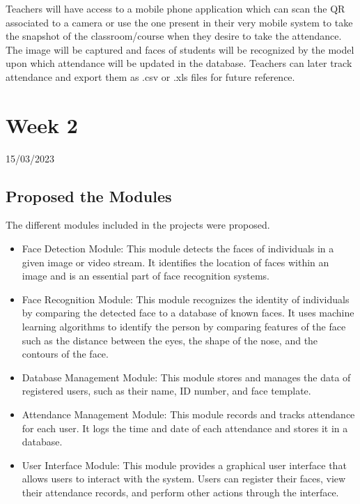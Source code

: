 \documentclass[12pt]{book}
\begin{document}
    Teachers will have access to a mobile phone application
    which can scan the QR associated to a camera or use the one
    present in their very mobile system to take the snapshot of
    the classroom/course when they desire to take the
    attendance. The image will be captured and faces of students
    will be recognized by the model upon which attendance will
    be updated in the database. Teachers can later track
    attendance and export them as .csv or .xls files for future
    reference.
    
    \chapter{Week 2}
    \justifying
    \large
    15/03/2023
    
    \paragraph{}
    \section{Proposed the Modules}
    The different modules included in the projects were proposed.
    
	\begin{itemize}
		
		\item Face Detection Module: This module detects the faces of individuals in a given image or video stream. It identifies the location of faces within an image and is an essential part of face recognition systems.
		
		\item Face Recognition Module: This module recognizes the identity of individuals by comparing the detected face to a database of known faces. It uses machine learning algorithms to identify the person by comparing features of the face such as the distance between the eyes, the shape of the nose, and the contours of the face.
		
		\item Database Management Module: This module stores and manages the data of registered users, such as their name, ID number, and face template.
		
		\item Attendance Management Module: This module records and tracks attendance for each user. It logs the time and date of each attendance and stores it in a database.
		
		\item User Interface Module: This module provides a graphical user interface that allows users to interact with the system. Users can register their faces, view their attendance records, and perform other actions through the interface.
		
	\end{itemize}
\end{document}
